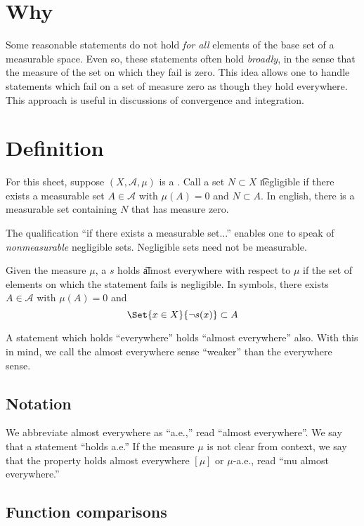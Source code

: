 
\section*{Why}

Some reasonable statements do not hold \textit{for all} elements of the base set of a measurable space.
Even so, these statements often hold \textit{broadly}, in the sense that the measure of the set on which they fail is zero.
This idea allows one to handle statements which fail on a set of measure zero as though they hold everywhere.
This approach is useful in discussions of convergence and integration.

\section*{Definition}

For this sheet, suppose $(X, \mathcal{A} , \mu )$ is a .
Call a set $N \subset X$ \t{negligible} if there exists a measurable set $A \in \mathcal{A} $ with $\mu (A) = 0$ and $N \subset A$.
In english, there is a measurable set containing $N$ that has measure zero.

The qualification ``if there exists a measurable set...'' enables one to speak of \textit{nonmeasurable} negligible sets.
Negligible sets need not be measurable.

Given the measure $\mu $, a $s$ holds \t{almost everywhere} with respect to $\mu $ if the set of elements on which the statement fails is negligible.
In symbols, there exists $A \in \mathcal{A} $ with $\mu (A) = 0$ and
\[
\Set{x \in X}{\neg s(x)} \subset A
\]

A statement which holds ``everywhere'' holds ``almost everywhere'' also.
With this in mind, we call the almost everywhere sense ``weaker'' than the everywhere sense.

\subsection*{Notation}

We abbreviate almost everywhere as ``a.e.,'' read ``almost everywhere''.
We say that a statement ``holds a.e.''
If the measure $\mu $ is not clear from context, we say that the property holds almost everywhere $[\mu ]$ or $\mu $-a.e., read ``mu almost everywhere.''

\subsection*{Function comparisons}

